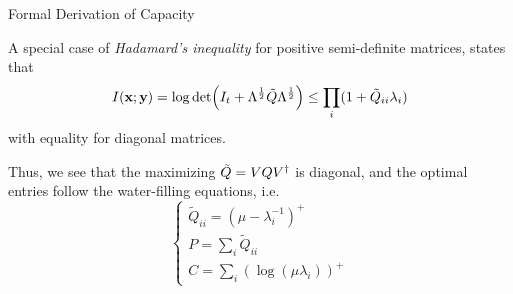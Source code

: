 \begin{frame}[allowframebreaks]{Formal Derivation of Capacity}
\framebreak

A special case of \textit{Hadamard's inequality} for positive semi-definite matrices, states that
$$I(\vb{x;y})
= \log\det(I_t + \Lambda^\frac{1}{2}\tilde{Q}\Lambda^\frac{1}{2})
\leq \prod_i (1+ \tilde{Q}_{ii}\lambda_i) $$
with equality for diagonal matrices.

Thus, we see that the maximizing $\tilde{Q} = VQV^\dagger$ is diagonal, and the optimal entries follow the water-filling equations, i.e.
\begin{equation*}
\begin{cases}
\displaystyle \tilde{Q}_{ii} = (\mu-\lambda_i^{-1})^+\\
\displaystyle P = \sum_i \tilde{Q}_{ii}\\
\displaystyle C = \sum_i (\log(\mu\lambda_i))^+
\end{cases}
\end{equation*}

\end{frame}